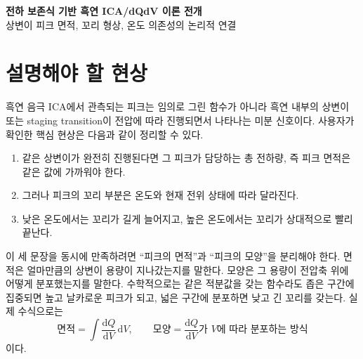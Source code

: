 \documentclass[11pt,a4paper]{article}
\newcommand{\dd}{\mathrm{d}}
\newcommand{\ext}{\mathrm{ext}}
\newcommand{\bg}{\mathrm{bg}}
\begin{document}
\begin{center}
{\LARGE\bfseries 전하 보존식 기반 흑연 ICA/dQdV 이론 전개}\\[0.6em]
{\large 상변이 피크 면적, 꼬리 형상, 온도 의존성의 논리적 연결}
\end{center}

\begin{abstract}
이 문서는 리튬이온전지 흑연 음극의 incremental capacity analysis, 즉 ICA \(=\dd Q/\dd V\)에서 상변이 피크가 왜 나타나고, 같은 상변이의 총 면적은 보존되면서도 온도와 현재 전위 상태에 따라 꼬리 형상이 왜 달라지는지를 전하 보존식에서 출발해 전개한다. 핵심은 전압 곡선을 먼저 가정하지 않는 것이다. 외부에서 흘린 전하 \(Q_{\ext}\), 정규화 전하 좌표 \(q\), 흑연 내부 상변이 진행률 \(\xi_j\), 배경 저장량 \(Q_{\bg}\)를 먼저 정의하고, 내부 음극 전위 \(V_n\)는 이들이 동시에 만족해야 하는 전하 보존식의 해로 정의한다. 그 뒤에 평형 OCV, 비평형 상변이 지연, \(dV/\dd q\), \(dQ/\dd V\), 피크 면적과 꼬리 형상을 차례로 유도한다. 따라서 피크 면적은 전이 용량과 진행률 변화량으로 정해지고, 꼬리 길이는 평형 위치 자체가 아니라 진행률이 평형값을 따라가는 속도, 즉 온도 의존적인 relaxation 길이로 설명된다.
\end{abstract}

\tableofcontents
\newpage

\section{설명해야 할 현상}

흑연 음극 ICA에서 관측되는 피크는 임의로 그린 함수가 아니라 흑연 내부의 상변이 또는 staging transition이 전압에 따라 진행되면서 나타나는 미분 신호이다. 사용자가 확인한 핵심 현상은 다음과 같이 정리할 수 있다.

\begin{enumerate}
\item 같은 상변이가 완전히 진행된다면 그 피크가 담당하는 총 전하량, 즉 피크 면적은 같은 값에 가까워야 한다.
\item 그러나 피크의 꼬리 부분은 온도와 현재 전위 상태에 따라 달라진다.
\item 낮은 온도에서는 꼬리가 길게 늘어지고, 높은 온도에서는 꼬리가 상대적으로 빨리 끝난다.
\end{enumerate}

이 세 문장을 동시에 만족하려면 ``피크의 면적''과 ``피크의 모양''을 분리해야 한다. 면적은 얼마만큼의 상변이 용량이 지나갔는지를 말한다. 모양은 그 용량이 전압축 위에 어떻게 분포했는지를 말한다. 수학적으로는 같은 적분값을 갖는 함수라도 좁은 구간에 집중되면 높고 날카로운 피크가 되고, 넓은 구간에 분포하면 낮고 긴 꼬리를 갖는다. 실제 수식으로는
\[
\text{면적}=\int \frac{\dd Q}{\dd V}\,\dd V,
\qquad
\text{모양}=\frac{\dd Q}{\dd V}\text{가 }V\text{에 따라 분포하는 방식}
\]
이다.
\end{document}
